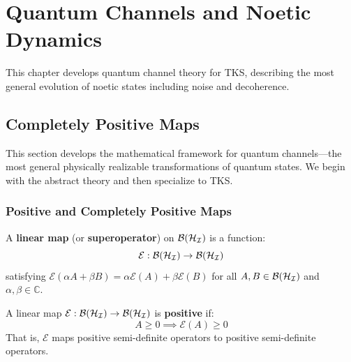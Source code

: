 \chapter{Quantum Channels and Noetic Dynamics}
\label{ch:quantum-channels}

\begin{tcolorbox}[colback=blue!5!white,colframe=blue!75!black,title=\vnewthree]
This chapter develops quantum channel theory for TKS, describing the most general evolution of noetic states including noise and decoherence.
\end{tcolorbox}

\section{Completely Positive Maps}
\label{sec:cp-maps}

This section develops the mathematical framework for quantum channels---the most general physically realizable transformations of quantum states. We begin with the abstract theory and then specialize to TKS.

\subsection{Positive and Completely Positive Maps}

\begin{definition}
\label{def:linear-map-operators}
A \textbf{linear map} (or \textbf{superoperator}) on $\mathcal{B}(\mathcal{H}_{\mathcal{I}})$ is a function:
\[
\mathcal{E} : \mathcal{B}(\mathcal{H}_{\mathcal{I}}) \to \mathcal{B}(\mathcal{H}_{\mathcal{I}})
\]
satisfying $\mathcal{E}(\alpha A + \beta B) = \alpha \mathcal{E}(A) + \beta \mathcal{E}(B)$ for all $A, B \in \mathcal{B}(\mathcal{H}_{\mathcal{I}})$ and $\alpha, \beta \in \mathbb{C}$.
\end{definition}

\begin{definition}
\label{def:positive-map}
A linear map $\mathcal{E} : \mathcal{B}(\mathcal{H}_{\mathcal{I}}) \to \mathcal{B}(\mathcal{H}_{\mathcal{I}})$ is \textbf{positive} if:
\[
A \geq 0 \implies \mathcal{E}(A) \geq 0
\]
That is, $\mathcal{E}$ maps positive semi-definite operators to positive semi-definite operators.
\end{definition}

